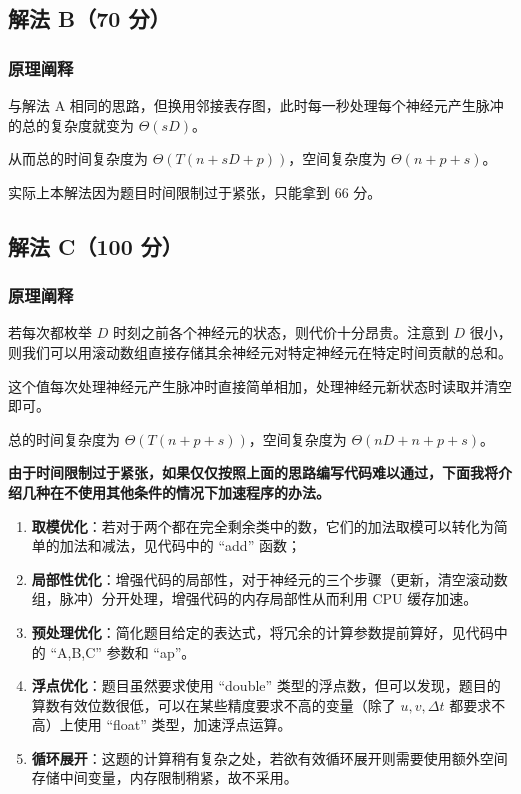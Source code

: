 	\subsection{解法 B（70 分）}
		\subsubsection{原理阐释}
			\par 与解法 A 相同的思路，但换用邻接表存图，此时每一秒处理每个神经元产生脉冲的总的复杂度就变为 $\Theta(sD)$。
			\par 从而总的时间复杂度为 $\Theta(T(n+sD+p))$，空间复杂度为 $\Theta(n+p+s)$。
			\par 实际上本解法因为题目时间限制过于紧张，只能拿到 $66$ 分。
	\subsection{解法 C（100 分）}
		\subsubsection{原理阐释}
			\par 若每次都枚举 $D$ 时刻之前各个神经元的状态，则代价十分昂贵。注意到 $D$ 很小，则我们可以用滚动数组直接存储其余神经元对特定神经元在特定时间贡献的总和。
			\par 这个值每次处理神经元产生脉冲时直接简单相加，处理神经元新状态时读取并清空即可。
			\par 总的时间复杂度为 $\Theta(T(n+p+s))$，空间复杂度为 $\Theta(nD+n+p+s)$。
			\par \textbf{由于时间限制过于紧张，如果仅仅按照上面的思路编写代码难以通过，下面我将介绍几种在不使用其他条件的情况下加速程序的办法。}
			\begin{enumerate}
				\item \textbf{取模优化}：若对于两个都在完全剩余类中的数，它们的加法取模可以转化为简单的加法和减法，见代码中的 ``add'' 函数；
				\item \textbf{局部性优化}：增强代码的局部性，对于神经元的三个步骤（更新，清空滚动数组，脉冲）分开处理，增强代码的内存局部性从而利用 CPU 缓存加速。
				\item \textbf{预处理优化}：简化题目给定的表达式，将冗余的计算参数提前算好，见代码中的 ``A,B,C'' 参数和 ``ap''。
				\item \textbf{浮点优化}：题目虽然要求使用 ``double'' 类型的浮点数，但可以发现，题目的算数有效位数很低，可以在某些精度要求不高的变量（除了 $u, v, \Delta t$ 都要求不高）上使用 ``float'' 类型，加速浮点运算。
				\item \textbf{循环展开}：这题的计算稍有复杂之处，若欲有效循环展开则需要使用额外空间存储中间变量，内存限制稍紧，故不采用。
			\end{enumerate}
